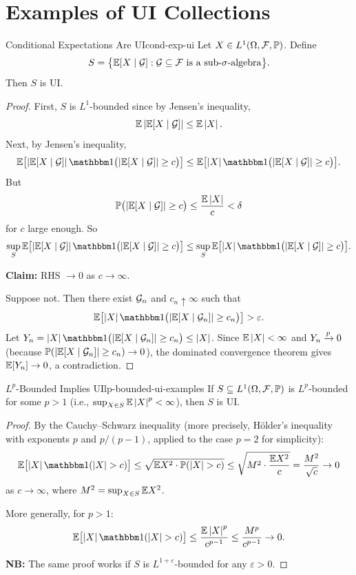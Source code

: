 \section{Examples of UI Collections}

\begin{lemma}{Conditional Expectations Are UI}{cond-exp-ui}
    Let $X \in L^1(\Omega, \mathcal{F}, \mathbb{P})$. Define
    \[
        S = \bigl\{\mathbb{E}[X \mid \mathcal{G}] : \mathcal{G} \subseteq \mathcal{F} \text{ is a sub-}\sigma\text{-algebra}\bigr\}.
    \]
    Then $S$ is UI.
\end{lemma}

\begin{proof}
    First, $S$ is $L^1$-bounded since by Jensen's inequality,
    \[
        \mathbb{E}\left|\mathbb{E}[X \mid \mathcal{G}]\right| \leq \mathbb{E}\left|X\right|.
    \]
    Next, by Jensen's inequality,
    \[
        \E\bigl[\abs{\E[X \mid \G]} \ind\bigl(\abs{\E[X \mid \G]} \geq c\bigr)\bigr]
        \leq \E\bigl[\abs{X} \ind\bigl(\abs{\E[X \mid \G]} \geq c\bigr)\bigr].
    \]
    But
    \[
        \mathbb{P}\bigl(\left|\mathbb{E}[X \mid \mathcal{G}]\right| \geq c\bigr) \leq \frac{\mathbb{E}\left|X\right|}{c} < \delta
    \]
    for $c$ large enough. So
    \[
        \sup_{S} \E\bigl[\abs{\E[X \mid \G]} \ind\bigl(\abs{\E[X \mid \G]} \geq c\bigr)\bigr]
        \leq \sup_S \E\bigl[\abs{X} \ind\bigl(\abs{\E[X \mid \G]} \geq c\bigr)\bigr].
    \]

    \textbf{Claim:} RHS $\to 0$ as $c \to \infty$.

    Suppose not. Then there exist $\mathcal{G}_n$ and $c_n \uparrow \infty$ such that
    \[
        \E\bigl[\abs{X} \ind\bigl(\abs{\E[X \mid \G_n]} \geq c_n\bigr)\bigr] > \varepsilon.
    \]
    Let $Y_n = \abs{X} \ind\bigl(\abs{\E[X \mid \G_n]} \geq c_n\bigr) \leq \abs{X}$. Since $\mathbb{E}\left|X\right| < \infty$ and $Y_n \xrightarrow{p} 0$ (because $\mathbb{P}(\left|\mathbb{E}[X \mid \mathcal{G}_n]\right| \geq c_n) \to 0$), the dominated convergence theorem gives $\mathbb{E}[Y_n] \to 0$, a contradiction.
\end{proof}

\begin{lemma}{$L^p$-Bounded Implies UI}{lp-bounded-ui-examples}
    If $S \subseteq L^1(\Omega, \mathcal{F}, \mathbb{P})$ is $L^p$-bounded for some $p > 1$ (i.e., $\sup_{X \in S} \mathbb{E}\left|X\right|^p < \infty$), then $S$ is UI.
\end{lemma}

\begin{proof}
    By the Cauchy--Schwarz inequality (more precisely, H\"older's inequality with exponents $p$ and $p/(p-1)$, applied to the case $p = 2$ for simplicity):
    \[
        \E\bigl[\abs{X} \ind(\abs{X} > c)\bigr]
        \leq \sqrt{\E X^2 \cdot \Prob(\abs{X} > c)}
        \leq \sqrt{M^2 \cdot \frac{\E X^2}{c}}
        = \frac{M^2}{\sqrt{c}}
        \to 0
    \]
    as $c \to \infty$, where $M^2 = \sup_{X \in S} \mathbb{E} X^2$.

    More generally, for $p > 1$:
    \[
        \E\bigl[\abs{X} \ind(\abs{X} > c)\bigr]
        \leq \frac{\E\abs{X}^p}{c^{p-1}}
        \leq \frac{M^p}{c^{p-1}} \to 0.
    \]

    \textbf{NB:} The same proof works if $S$ is $L^{1+\varepsilon}$-bounded for any $\varepsilon > 0$.
\end{proof}

